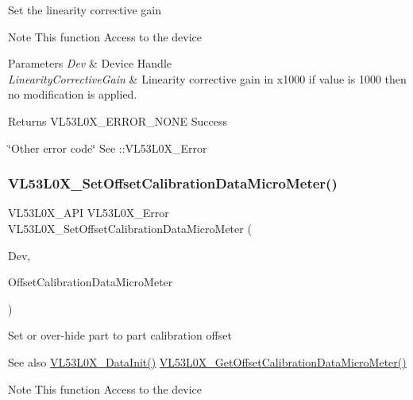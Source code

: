 Set the linearity corrective gain

\begin{DoxyNote}{Note}
This function Access to the device
\end{DoxyNote}

\begin{DoxyParams}{Parameters}
{\em Dev} & Device Handle \\
\hline
{\em Linearity\+Corrective\+Gain} & Linearity corrective gain in x1000 if value is 1000 then no modification is applied. \\
\hline
\end{DoxyParams}
\begin{DoxyReturn}{Returns}
V\+L53\+L0\+X\+\_\+\+E\+R\+R\+O\+R\+\_\+\+N\+O\+NE Success 

\char`\"{}\+Other error code\char`\"{} See \+::\+V\+L53\+L0\+X\+\_\+\+Error 
\end{DoxyReturn}
\mbox{\label{group__VL53L0X__general__group_ga6d87e7c39e30ede9f158362624487718}} 
\subsubsection{\texorpdfstring{V\+L53\+L0\+X\+\_\+\+Set\+Offset\+Calibration\+Data\+Micro\+Meter()}{VL53L0X\_SetOffsetCalibrationDataMicroMeter()}}
{\footnotesize\ttfamily V\+L53\+L0\+X\+\_\+\+A\+PI V\+L53\+L0\+X\+\_\+\+Error V\+L53\+L0\+X\+\_\+\+Set\+Offset\+Calibration\+Data\+Micro\+Meter (\begin{DoxyParamCaption}\item[{\hyperlink{group__VL53L0X__platform__group_ga2d6405308b1dd524b462f1b8fb97d167}{V\+L53\+L0\+X\+\_\+\+D\+EV}}]{Dev,  }\item[{\hyperlink{vl53l0x__types_8h_a32f2e37ee053cf2ce8ca28d1f74630e5}{int32\+\_\+t}}]{Offset\+Calibration\+Data\+Micro\+Meter }\end{DoxyParamCaption})}

Set or over-\/hide part to part calibration offset \begin{DoxySeeAlso}{See also}
\hyperlink{group__VL53L0X__init__group_gabb81d6ad638363d555a1b1b038b23354}{V\+L53\+L0\+X\+\_\+\+Data\+Init()} \hyperlink{group__VL53L0X__general__group_ga724ec9400a6d5667e10bda476cc43029}{V\+L53\+L0\+X\+\_\+\+Get\+Offset\+Calibration\+Data\+Micro\+Meter()}
\end{DoxySeeAlso}
\begin{DoxyNote}{Note}
This function Access to the device
\end{DoxyNote}

